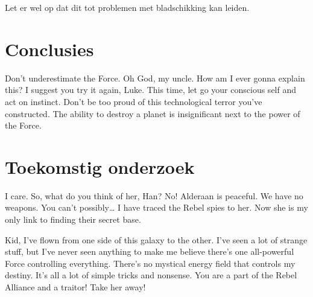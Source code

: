 \documentclass[a0,portrait]{hogent-poster}
\begin{document}
\begin{multicols}{2}
Let er wel op dat dit tot problemen met bladschikking kan leiden.

\section{Conclusies}

Don't underestimate the Force. Oh God, my uncle. How am I ever gonna explain this? I suggest you try it again, Luke. This time, let go your conscious self and act on instinct. Don't be too proud of this technological terror you've constructed. The ability to destroy a planet is insignificant next to the power of the Force.

\section{Toekomstig onderzoek}

I care. So, what do you think of her, Han? No! Alderaan is peaceful. We have no weapons. You can't possibly… I have traced the Rebel spies to her. Now she is my only link to finding their secret base.

Kid, I've flown from one side of this galaxy to the other. I've seen a lot of strange stuff, but I've never seen anything to make me believe there's one all-powerful Force controlling everything. There's no mystical energy field that controls my destiny. It's all a lot of simple tricks and nonsense. You are a part of the Rebel Alliance and a traitor! Take her away! 

\end{multicols}
\end{document}
